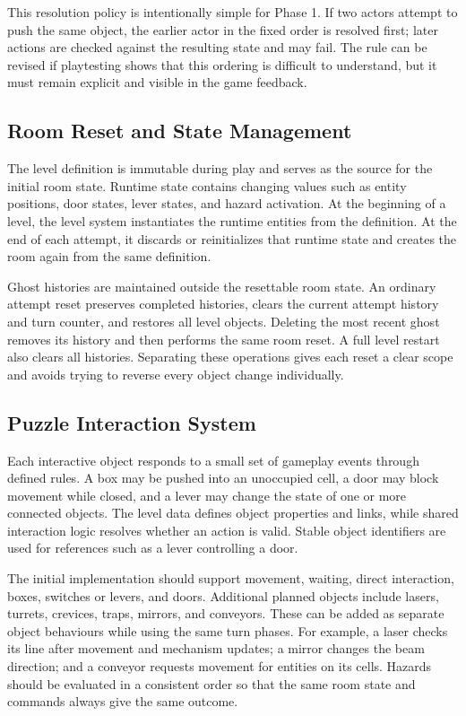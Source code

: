 This resolution policy is intentionally simple for Phase 1. If two actors attempt to push the same object, the earlier actor in the fixed order is resolved first; later actions are checked against the resulting state and may fail. The rule can be revised if playtesting shows that this ordering is difficult to understand, but it must remain explicit and visible in the game feedback.

\subsection{Room Reset and State Management}

The level definition is immutable during play and serves as the source for the initial room state. Runtime state contains changing values such as entity positions, door states, lever states, and hazard activation. At the beginning of a level, the level system instantiates the runtime entities from the definition. At the end of each attempt, it discards or reinitializes that runtime state and creates the room again from the same definition.

Ghost histories are maintained outside the resettable room state. An ordinary attempt reset preserves completed histories, clears the current attempt history and turn counter, and restores all level objects. Deleting the most recent ghost removes its history and then performs the same room reset. A full level restart also clears all histories. Separating these operations gives each reset a clear scope and avoids trying to reverse every object change individually.

\subsection{Puzzle Interaction System}

Each interactive object responds to a small set of gameplay events through defined rules. A box may be pushed into an unoccupied cell, a door may block movement while closed, and a lever may change the state of one or more connected objects. The level data defines object properties and links, while shared interaction logic resolves whether an action is valid. Stable object identifiers are used for references such as a lever controlling a door.

The initial implementation should support movement, waiting, direct interaction, boxes, switches or levers, and doors. Additional planned objects include lasers, turrets, crevices, traps, mirrors, and conveyors. These can be added as separate object behaviours while using the same turn phases. For example, a laser checks its line after movement and mechanism updates; a mirror changes the beam direction; and a conveyor requests movement for entities on its cells. Hazards should be evaluated in a consistent order so that the same room state and commands always give the same outcome.

